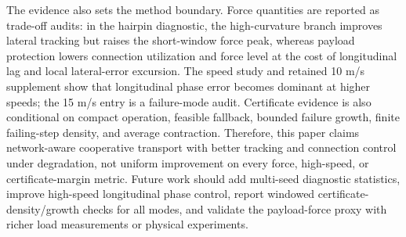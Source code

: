 \documentclass[twocolumn,3p,times,procedia]{elsarticle}
\begin{document}
The evidence also sets the method boundary. Force quantities are reported as trade-off audits: in the hairpin diagnostic, the high-curvature branch improves lateral tracking but raises the short-window force peak, whereas payload protection lowers connection utilization and force level at the cost of longitudinal lag and local lateral-error excursion. The speed study and retained 10 m/s supplement show that longitudinal phase error becomes dominant at higher speeds; the 15 m/s entry is a failure-mode audit. Certificate evidence is also conditional on compact operation, feasible fallback, bounded failure growth, finite failing-step density, and average contraction. Therefore, this paper claims network-aware cooperative transport with better tracking and connection control under degradation, not uniform improvement on every force, high-speed, or certificate-margin metric. Future work should add multi-seed diagnostic statistics, improve high-speed longitudinal phase control, report windowed certificate-density/growth checks for all modes, and validate the payload-force proxy with richer load measurements or physical experiments.

\FloatBarrier
\begingroup
\fontsize{7}{7}\selectfont
\setlength{\bibsep}{0pt plus 0.1ex}


\endgroup
\end{document}
